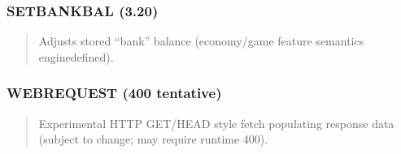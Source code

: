 \documentclass[letterpaper,10pt,english]{sphinxmanual}
\begin{document}
\subsubsection{SETBANKBAL (3.20)}
\label{\detokenize{ppl:setbankbal-3-20}}\begin{quote}

\sphinxAtStartPar
{}
\begin{description}
\sphinxAtStartPar
Adjusts stored “bank” balance (economy/game feature \textendash{} semantics engine\sphinxhyphen{}defined).

\end{description}
\end{quote}


\subsubsection{WEBREQUEST (400 tentative)}
\label{\detokenize{ppl:webrequest-400-tentative}}\begin{quote}

\sphinxAtStartPar
{}
\begin{description}
\sphinxAtStartPar
Experimental HTTP GET/HEAD style fetch populating response data (subject to change; may require runtime 400).

\end{description}
\end{quote}
\end{document}
